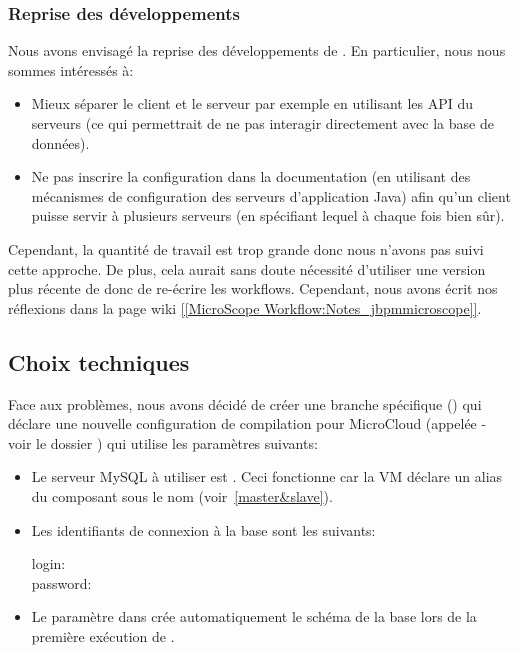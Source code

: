 \subsubsection{Reprise des développements}

Nous avons envisagé la reprise des développements de .
En particulier, nous nous sommes intéressés à:
\begin{itemize}
    \item Mieux séparer le client et le serveur par exemple en utilisant les API du serveurs (ce qui permettrait de ne pas interagir directement avec la base de données).
    \item Ne pas inscrire la configuration dans la documentation (en utilisant des mécanismes de configuration des serveurs d'application Java)
          afin qu'un client puisse servir à plusieurs serveurs (en spécifiant lequel à chaque fois bien sûr).
\end{itemize}

Cependant, la quantité de travail est trop grande donc nous n'avons pas suivi cette approche.
De plus, cela aurait sans doute nécessité d'utiliser une version plus récente de 
donc de re-écrire les workflows.
Cependant, nous avons écrit nos réflexions dans la page wiki \href{https://intranet.genoscope.cns.fr/agc/redmine/projects/microscopeworkflow/wiki/Notes_jbpmmicroscope}{[[MicroScope Workflow:Notes\_jbpmmicroscope]]}.

\subsection{Choix techniques}

Face aux problèmes, nous avons décidé de créer une branche spécifique ()
qui déclare une nouvelle configuration de compilation pour MicroCloud (appelée  - voir le dossier )
qui utilise les paramètres suivants:
\begin{itemize}
    \item Le serveur MySQL à utiliser est .
          Ceci fonctionne car la VM  déclare un alias du composant  sous le nom 
          (voir~\autoref{master&slave}).
    \item Les identifiants de connexion à la base  sont les suivants:
          \begin{description}
              \item[login:] 
              \item[password:] 
          \end{description}
    \item Le paramètre  dans  crée automatiquement le schéma de la base  lors de la première exécution de .
\end{itemize}\vspace*{\baselineskip}

